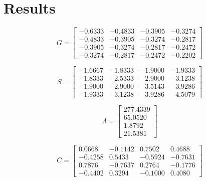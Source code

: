 \documentclass{article}
\begin{document}
\section*{Results}

\begin{tcolorbox}[title=Gram Matrix $G$]
\[
G =
\begin{bmatrix}
-0.6333 & -0.4833 & -0.3905 & -0.3274 \\
-0.4833 & -0.3905 & -0.3274 & -0.2817 \\
-0.3905 & -0.3274 & -0.2817 & -0.2472 \\
-0.3274 & -0.2817 & -0.2472 & -0.2202
\end{bmatrix}
\]
\end{tcolorbox}

\vspace{0.5cm}

\begin{tcolorbox}[title=Stiffness Matrix $S$]
\[
S =
\begin{bmatrix}
-1.6667 & -1.8333 & -1.9000 & -1.9333 \\
-1.8333 & -2.5333 & -2.9000 & -3.1238 \\
-1.9000 & -2.9000 & -3.5143 & -3.9286 \\
-1.9333 & -3.1238 & -3.9286 & -4.5079
\end{bmatrix}
\]
\end{tcolorbox}

\vspace{0.5cm}

\begin{tcolorbox}[title=Eigenvalues $\Lambda$]
\[
\Lambda =
\begin{bmatrix}
277.4339 \\
65.0520 \\
1.8792 \\
21.5381
\end{bmatrix}
\]
\end{tcolorbox}

\vspace{0.5cm}

\begin{tcolorbox}[title=Eigenvectors $C$]
\[
C =
\begin{bmatrix}
0.0668  & -0.1142 & 0.7502  & 0.4688 \\
-0.4258 & 0.5433  & -0.5924 & -0.7631 \\
0.7876  & -0.7637 & 0.2764  & -0.1776 \\
-0.4402 & 0.3294  & -0.1000 & 0.4080
\end{bmatrix}
\]
\end{tcolorbox}
\end{document}
